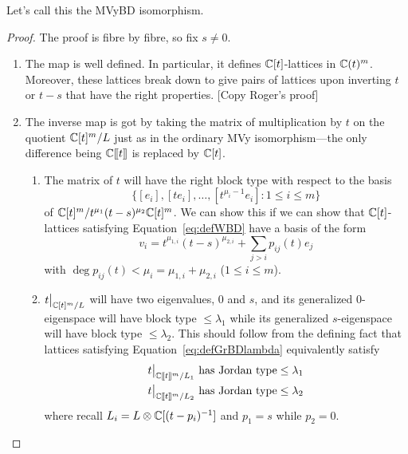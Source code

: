 \documentclass{article}
\begin{document}
Let's call this the MVyBD isomorphism.

\begin{proof}
    The proof is fibre by fibre, so fix $s\ne 0$. 
    \begin{enumerate}
        \item The map is well defined. In particular, it defines $\mathbb C[t]$-lattices in $\mathbb C(t)^m$. Moreover, these lattices break down to give pairs of lattices upon inverting $t$ or $t-s$ that have the right properties. [Copy Roger's proof]
        \item The inverse map is got by taking the matrix of multiplication by $t$ on the quotient $\mathbb C[t]^m/L$ just as in the ordinary MVy isomorphism---the only difference being $\mathbb C[\hspace{-.12em}[ {t} ]\hspace{-.12em}]$ is replaced by $\mathbb C[t]$.
\begin{enumerate}
    \item The matrix of $t$ will have the right block type with respect to the basis 
    \begin{equation}
        \{[e_i],[te_i],\dots,[t^{\mu_{i}-1}e_i] : 1\le i \le m\}
    \end{equation}
    of $\mathbb C[t]^m/t^{\mu_1}(t-s)^{\mu_2}\mathbb C[t]^m$. 
    We can show this if we can show that $\mathbb C[t]$-lattices satisfying Equation~\ref{eq:defWBD} have a basis of the form 
    \begin{equation}
        v_i = t^{\mu_{1,i}}(t-s)^{\mu_{2,i}} + \sum_{j>i} p_{ij}(t) e_j 
    \end{equation}
    with $\deg p_{ij}(t) < \mu_i = \mu_{1,i} + \mu_{2,i}$ ($1\le i\le m$).
    \item $t\big|_{\mathbb C[t]^m/L}$ will have two eigenvalues, 0 and $s$, and its generalized 0-eigenspace will have block type $\le \lambda_1$ while its generalized $s$-eigenspace will have block type $\le \lambda_2$. 
    This should follow from the defining fact that lattices satisfying Equation~\ref{eq:defGrBDlambda} equivalently satisfy 
    \begin{equation}
        \begin{split}
            t\big|_{\mathbb C[\hspace{-.12em}[ {t} ]\hspace{-.12em}]^m/L_1}\text{ has Jordan type} \le \lambda_1 \\
            t\big|_{\mathbb C[\hspace{-.12em}[ {t} ]\hspace{-.12em}]^m/L_2}\text{ has Jordan type} \le \lambda_2 
        \end{split}
    \end{equation}
    where recall $L_i = L\otimes \mathbb C[(t-p_i)^{-1}]$ and $p_1 = s$ while $p_2 = 0$. 
\end{enumerate}
    \end{enumerate}
\end{proof}
\end{document}
